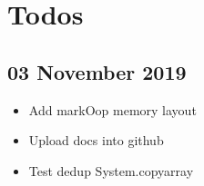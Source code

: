 \section{Todos}

\subsection{03 November 2019}
\begin{itemize}
\item Add markOop memory layout
\item Upload docs into github
\item Test dedup System.copyarray 
\end{itemize}
